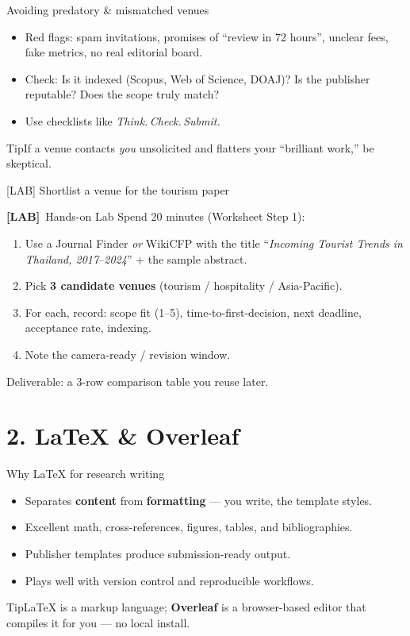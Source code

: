 \documentclass[aspectratio=169,11pt]{beamer}
\newcommand{\faLabel}{\textbf{[LAB]}~}
\newcommand{\lab}[1]{\begin{block}{\faLabel Hands-on Lab}#1\end{block}}
\newcommand{\tipbox}[1]{\begin{block}{Tip}#1\end{block}}
\begin{document}
\begin{frame}{Avoiding predatory \& mismatched venues}
  \begin{itemize}
    \item Red flags: spam invitations, promises of ``review in 72 hours'', unclear fees, fake metrics, no real editorial board.
    \item Check: Is it indexed (Scopus, Web of Science, DOAJ)? Is the publisher reputable? Does the scope truly match?
    \item Use checklists like \emph{Think.\,Check.\,Submit.}
  \end{itemize}
  \tipbox{If a venue contacts \emph{you} unsolicited and flatters your ``brilliant work,'' be skeptical.}
\end{frame}

\begin{frame}{[LAB] Shortlist a venue for the tourism paper}
  \lab{
  \footnotesize Spend 20 minutes (Worksheet Step 1):
  \begin{enumerate}
    \item Use a Journal Finder \emph{or} WikiCFP with the title ``\emph{Incoming Tourist Trends in Thailand, 2017--2024}'' + the sample abstract.
    \item Pick \textbf{3 candidate venues} (tourism / hospitality / Asia-Pacific).
    \item For each, record: scope fit (1--5), time-to-first-decision, next deadline, acceptance rate, indexing.
    \item Note the camera-ready / revision window.
  \end{enumerate}
  Deliverable: a 3-row comparison table you reuse later.}
\end{frame}

\section{2. LaTeX \& Overleaf}
\begin{frame}{Why LaTeX for research writing}
  \begin{itemize}
    \item Separates \textbf{content} from \textbf{formatting} --- you write, the template styles.
    \item Excellent math, cross-references, figures, tables, and bibliographies.
    \item Publisher templates produce submission-ready output.
    \item Plays well with version control and reproducible workflows.
  \end{itemize}
  \tipbox{LaTeX is a markup language; \textbf{Overleaf} is a browser-based editor that compiles it for you --- no local install.}
\end{frame}
\end{document}
